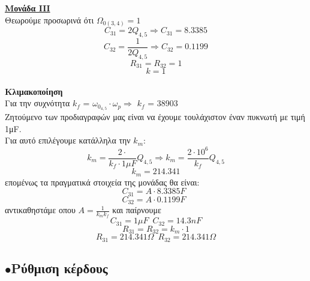 \documentclass{article}
\begin{document}
\large{ \underline{\textbf{Μονάδα IIΙ}} \\[0.4\baselineskip]}
\large{}
Θεωρούμε προσωρινά ότι $Ω_{0(3,4)} = 1$
\begin{equation*}
C_{31} = 2Q_{4,5} \Rightarrow \boxed{C_{31} = 8.3385}
\end{equation*}
\begin{equation*}
C_{32} = \frac{1}{2Q_{4,5}} \Rightarrow \boxed{C_{32} = 0.1199}
\end{equation*}
\begin{equation*}
R_{31} = R_{32} = 1 
\end{equation*}
\begin{equation*}
k=1
\end{equation*}
\\[0.4\baselineskip]
\large{ {\textbf{Κλιμακοποίηση}} \\[0.4\baselineskip]}
\large{}
Για την συχνότητα $k_f$ = $ω_{0_{4,5}}\cdot ω_p \Rightarrow$ $k_f$ = 38903 \\ 
Ζητούμενο των προδιαγραφών μας είναι να έχουμε τουλάχιστον έναν πυκνωτή με τιμή 1μF. \\
Για αυτό επιλέγουμε κατάλληλα την $k_m$:
\begin{equation*}
 k_m = \frac{2 \cdot }{k_f \cdot 1μF}Q_{4,5} \Rightarrow k_m = \frac{2 \cdot 10^6}{k_f}Q_{4,5}
\end{equation*}
\begin{equation*}
k_m = 214.341
\end{equation*}
επομένως τα πραγματικά στοιχεία της μονάδας θα είναι:
\begin{equation*}
C_{31}= A \cdot 8.3385 F \enspace  
\end{equation*}
\begin{equation*}
C_{32}= A \cdot 0.1199 F \enspace  
\end{equation*}
αντικαθηστάμε οπου $Α = \frac{1}{k_m k_f}$ και παίρνουμε
\begin{equation*}
\boxed{C_{31}=1μF} \enspace \boxed{C_{32}=14.3nF}
\end{equation*}
\begin{equation*}
R_{31}= R_{32} = k_m \cdot 1
\end{equation*}
\begin{equation*}
\boxed{R_{31}=214.341  Ω} \enspace \boxed{R_{32}=214.341 Ω}
\end{equation*}
\newpage
 \subsection*{$\bullet$Ρύθμιση κέρδους}
 
\end{document}
